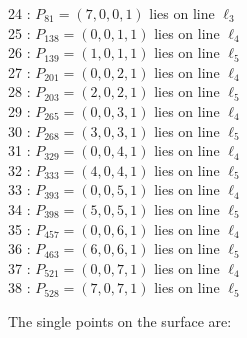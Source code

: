 \documentclass{article}
\begin{document}
{\begin{multicols}{2}
24 : $P_{81}=( 7, 0, 0, 1 )$ lies on line $\ell_{3}$\\
25 : $P_{138}=( 0, 0, 1, 1 )$ lies on line $\ell_{4}$\\
26 : $P_{139}=( 1, 0, 1, 1 )$ lies on line $\ell_{5}$\\
27 : $P_{201}=( 0, 0, 2, 1 )$ lies on line $\ell_{4}$\\
28 : $P_{203}=( 2, 0, 2, 1 )$ lies on line $\ell_{5}$\\
29 : $P_{265}=( 0, 0, 3, 1 )$ lies on line $\ell_{4}$\\
30 : $P_{268}=( 3, 0, 3, 1 )$ lies on line $\ell_{5}$\\
31 : $P_{329}=( 0, 0, 4, 1 )$ lies on line $\ell_{4}$\\
32 : $P_{333}=( 4, 0, 4, 1 )$ lies on line $\ell_{5}$\\
33 : $P_{393}=( 0, 0, 5, 1 )$ lies on line $\ell_{4}$\\
34 : $P_{398}=( 5, 0, 5, 1 )$ lies on line $\ell_{5}$\\
35 : $P_{457}=( 0, 0, 6, 1 )$ lies on line $\ell_{4}$\\
36 : $P_{463}=( 6, 0, 6, 1 )$ lies on line $\ell_{5}$\\
37 : $P_{521}=( 0, 0, 7, 1 )$ lies on line $\ell_{4}$\\
38 : $P_{528}=( 7, 0, 7, 1 )$ lies on line $\ell_{5}$\\
\end{multicols}
The single points on the surface are:\\
}
\end{document}
